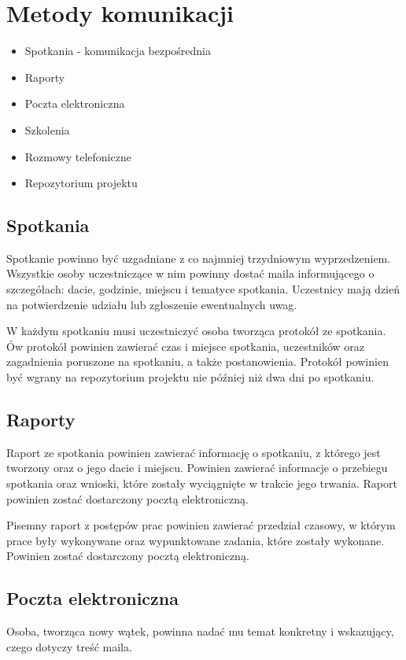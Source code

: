 \documentclass{article}
\begin{document}
\section{Metody komunikacji}
\begin{itemize}
	\item Spotkania - komunikacja bezpośrednia
	\item Raporty
	\item Poczta elektroniczna
	\item Szkolenia
	\item Rozmowy telefoniczne
	\item Repozytorium projektu
\end{itemize}

\subsection{Spotkania}
Spotkanie powinno być uzgadniane z co najmniej trzydniowym wyprzedzeniem. Wszystkie osoby uczestniczące w nim powinny dostać maila informującego o szczegółach: dacie, godzinie, miejscu i tematyce spotkania. Uczestnicy mają dzień na potwierdzenie udziału lub zgłoszenie ewentualnych uwag.

W każdym spotkaniu musi uczestniczyć osoba tworząca protokół ze spotkania. Ów protokół powinien zawierać czas i miejsce spotkania, uczestników oraz zagadnienia poruszone na spotkaniu, a także postanowienia. Protokół powinien być wgrany na repozytorium projektu nie później niż dwa dni po spotkaniu.

\subsection{Raporty}
Raport ze spotkania powinien zawierać informację o spotkaniu, z którego jest tworzony oraz o jego dacie i miejscu. Powinien zawierać informacje o przebiegu spotkania oraz wnioski, które zostały wyciągnięte w trakcie jego trwania. Raport powinien zostać dostarczony pocztą elektroniczną. 

Pisemny raport z postępów prac powinien zawierać przedział czasowy, w którym prace były wykonywane oraz wypunktowane zadania, które zostały wykonane. Powinien zostać dostarczony pocztą elektroniczną.



\subsection{Poczta elektroniczna}
Osoba, tworząca nowy wątek, powinna nadać mu temat konkretny i wskazujący, czego dotyczy treść maila. 
\end{document}
